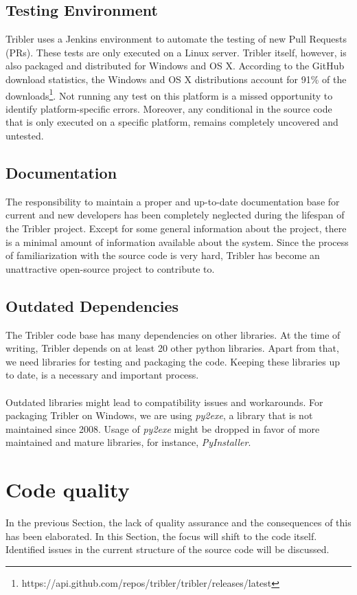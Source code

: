 \subsection{Testing Environment}
Tribler uses a Jenkins environment to automate the testing of new Pull Requests (PRs). These tests are only executed on a Linux server. Tribler itself, however, is also packaged and distributed for Windows and OS X. According to the GitHub download statistics, the Windows and OS X distributions account for 91\% of the downloads\footnote{https://api.github.com/repos/tribler/tribler/releases/latest}. Not running any test on this platform is a missed opportunity to identify platform-specific errors. Moreover, any conditional in the source code that is only executed on a specific platform, remains completely uncovered and untested.

\subsection{Documentation}
The responsibility to maintain a proper and up-to-date documentation base for current and new developers has been completely neglected during the lifespan of the Tribler project. Except for some general information about the project, there is a minimal amount of information available about the system. Since the process of familiarization with the source code is very hard, Tribler has become an unattractive open-source project to contribute to.

\subsection{Outdated Dependencies}
The Tribler code base has many dependencies on other libraries. At the time of writing, Tribler depends on at least 20 other python libraries. Apart from that, we need libraries for testing and packaging the code. Keeping these libraries up to date, is a necessary and important process.\\\\
Outdated libraries might lead to compatibility issues and workarounds. For packaging Tribler on Windows, we are using \emph{py2exe}, a library that is not maintained since 2008. Usage of \emph{py2exe} might be dropped in favor of more maintained and mature libraries, for instance, \emph{PyInstaller}.


\section{Code quality}
In the previous Section, the lack of quality assurance and the consequences of this has been elaborated. In this Section, the focus will shift to the code itself. Identified issues in the current structure of the source code will be discussed.


